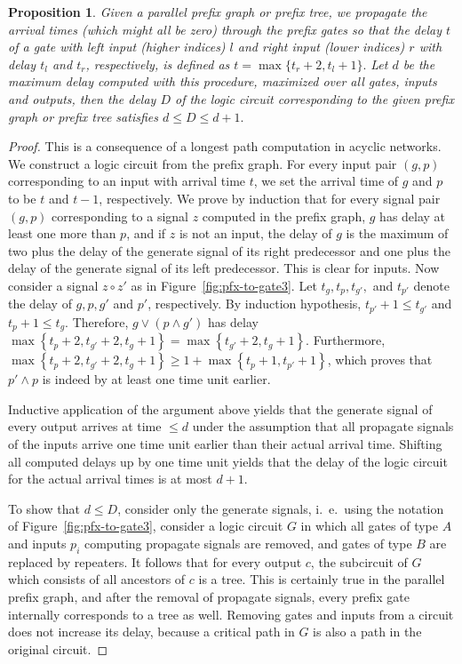 \documentclass[11pt,final,microtype]{scrartcl}
\theoremstyle{plain}
\newtheorem{proposition}[theorem]{Proposition}
\theoremstyle{definition}
\theoremstyle{remark}
\newcommand{\sset}[1]{\left\{#1\right\}}
\begin{document}
\begin{proposition} \label{lem:pfx-to-logic} Given a parallel prefix graph
  or prefix tree, we propagate the arrival times (which might all be
  zero) through the prefix gates so that the delay $t$ of a gate with
  left input (higher indices) $l$ and right input (lower indices) $r$
  with delay $t_l$ and $t_r$, respectively, is defined as $t =
  \max\{t_r+2, t_l+1\}.$ Let $d$ be the maximum delay computed with
  this procedure, maximized over all gates, inputs and outputs, then
  the delay $D$ of the logic circuit corresponding to the given prefix
  graph or prefix tree satisfies
  $d \leq D \leq d+1.$
\end{proposition}
\begin{proof}
  This is a  consequence of a longest path computation in acyclic networks.
  We construct a logic circuit from the prefix graph. For every input
  pair $(g, p)$ corresponding to an input with arrival time $t$, we
  set the arrival time of $g$ and $p$ to be $t$ and $t-1$,
  respectively. We prove by induction that for every signal pair $(g,
  p)$ corresponding to a signal $z$ computed in the prefix graph, $g$
  has delay at least one more than $p$, and if $z$ is not an input,
  the delay of $g$ is the maximum of two plus the delay of the
  generate signal of its right predecessor and one plus the delay of
  the generate signal of its left predecessor. This is clear for
  inputs. Now consider a signal $z \circ z'$ as in
  Figure~\ref{fig:pfx-to-gate3}. Let $t_{g}, t_{p}, t_{g'},$ and
  $t_{p'}$ denote the delay of $g, p, g'$ and $p'$,
  respectively. By induction hypothesis, $t_{p'} + 1 \leq t_{g'}$
  and $t_{p} + 1 \leq t_{g}$. Therefore, $g \vee (p \wedge
  g')$ has delay $\max \sset{t_{p} + 2, t_{g'} + 2, t_{g} + 1} =
  \max \sset{t_{g'} + 2, t_{g} + 1}$. Furthermore, $\max
  \sset{t_{p} + 2, t_{g'} + 2, t_{g} + 1} \geq 1 + \max
  \sset{t_{p} + 1, t_{p'} + 1}$, which proves that $p' \wedge p$
  is indeed by at least one time unit earlier. 

  Inductive application of the argument above yields that the generate
  signal of every output arrives at time $\leq d$ under the assumption
  that all propagate signals of the inputs arrive one time unit
  earlier than their actual arrival time. Shifting all computed delays
  up by one time unit yields that the delay of the logic circuit for
  the actual arrival times is at most $d+1$.

  To show that $d \leq D$, consider only the generate signals, i.\ e.\
  using the notation of Figure~\ref{fig:pfx-to-gate3}, consider a
  logic circuit $G$ in which all gates of type $A$ and inputs $p_i$
  computing propagate signals are removed, and gates of type $B$ are
  replaced by repeaters. It follows that for every output $c$, the
  subcircuit of $G$ which consists of all ancestors of $c$ is a
  tree. This is certainly true in the parallel prefix graph, and after
  the removal of propagate signals, every prefix gate internally
  corresponds to a tree as well. Removing gates and inputs from a
  circuit does not increase its delay, because a critical path in $G$
  is also a path in the original circuit.


\end{proof}
\end{document}

